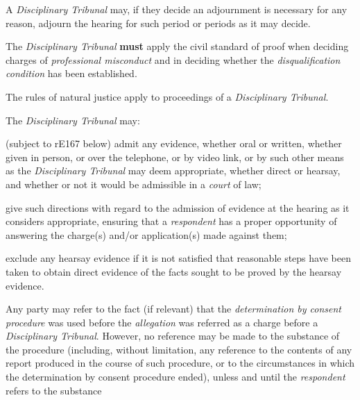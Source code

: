 \par
A \emph{Disciplinary Tribunal} may, if they decide an adjournment is
necessary for any reason, adjourn the hearing for such period or periods
as it may decide.\\
\par
{}
The \emph{Disciplinary Tribunal}  \textcolor{myred}{\textbf{must}} apply the civil standard of proof
when deciding charges of \emph{professional misconduct} and in deciding
whether the \emph{disqualification condition} has been established.\\
\par
{}
The rules of natural justice apply to proceedings of
a \emph{Disciplinary Tribunal}.\\
\par
{}
The \emph{Disciplinary Tribunal} may:\\\nl \item (subject to rE167 below) admit any evidence, whether oral or written,
whether given in person, or over the telephone, or by video link, or by
such other means as the \emph{Disciplinary Tribunal} may deem
appropriate, whether direct or hearsay, and whether or not it would be
admissible in a \emph{court} of law;\item give such directions with regard to the admission of evidence at the
hearing as it considers appropriate, ensuring that
a \emph{respondent} has a proper opportunity of answering the charge(s)
and/or application(s) made against them;\item exclude any hearsay evidence if it is not satisfied that reasonable
steps have been taken to obtain direct evidence of the facts sought to
be proved by the hearsay evidence.\ln
{}\par
Any party may refer to the fact (if relevant) that
the \emph{determination by consent procedure} was used before
the \emph{allegation} was referred as a charge before
a \emph{Disciplinary Tribunal}. However, no reference may be made to the
substance of the procedure (including, without limitation, any reference
to the contents of any report produced in the course of such procedure,
or to the circumstances in which the determination by consent procedure
ended), unless and until the \emph{respondent} refers to the substance
